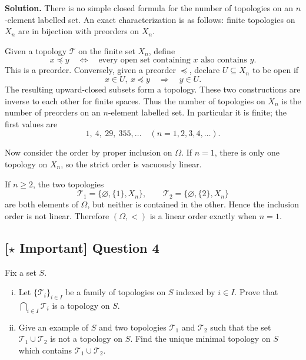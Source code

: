 \documentclass{article}
\newcommand{\important}{\texorpdfstring{\textbf{[\(\star\) Important]}}{[Important]}}
\newenvironment{solution}{\par\noindent\textbf{Solution.}\quad}{\par}
\begin{document}
\begin{solution}
There is no simple closed formula for the number of topologies on an
$n$-element labelled set. An exact characterization is as follows: finite
topologies on $X_n$ are in bijection with preorders on $X_n$.

Given a topology $\mathcal T$ on the finite set $X_n$, define
\[
  x\preceq y
  \quad\Longleftrightarrow\quad
  \text{every open set containing }x\text{ also contains }y.
\]
This is a preorder. Conversely, given a preorder $\preceq$, declare
$U\subseteq X_n$ to be open if
\[
  x\in U,\ x\preceq y \quad\Longrightarrow\quad y\in U.
\]
The resulting upward-closed subsets form a topology. These two
constructions are inverse to each other for finite spaces. Thus the number
of topologies on $X_n$ is the number of preorders on an $n$-element
labelled set. In particular it is finite; the first values are
\[
  1,\ 4,\ 29,\ 355,\ldots\quad(n=1,2,3,4,\ldots).
\]

Now consider the order by proper inclusion on $\Omega$. If $n=1$, there is
only one topology on $X_n$, so the strict order is vacuously linear.

If $n\ge2$, the two topologies
\[
  \mathcal T_1=\{\varnothing,\{1\},X_n\},\qquad
  \mathcal T_2=\{\varnothing,\{2\},X_n\}
\]
are both elements of $\Omega$, but neither is contained in the other.
Hence the inclusion order is not linear. Therefore $(\Omega,<)$ is a
linear order exactly when $n=1$.
\end{solution}

\subsection{\important{} Question 4}
Fix a set $S$.
\begin{enumerate}[(i)]
  \item Let $\{\mathcal{T}_i\}_{i \in I}$ be a family of topologies on $S$ indexed by $i \in I$. Prove that $\bigcap_{i \in I} \mathcal{T}_i$ is a topology on $S$.
  \item Give an example of $S$ and two topologies $\mathcal{T}_1$ and $\mathcal{T}_2$ such that the set $\mathcal{T}_1 \cup \mathcal{T}_2$ is not a topology on $S$. Find the unique minimal topology on $S$ which contains $\mathcal{T}_1 \cup \mathcal{T}_2$.
\end{enumerate}
\end{document}
